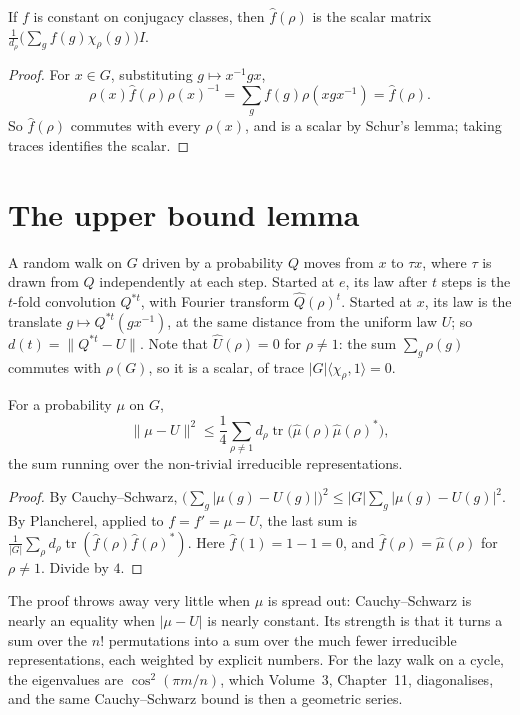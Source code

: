 \begin{proposition}\label{prop:classfourier}
If $f$ is constant on conjugacy classes, then $\hat f(\rho)$ is the scalar matrix $\frac1{d_\rho}\bigl(\sum_gf(g)\chi_\rho(g)\bigr)I$.
\end{proposition}

\begin{proof}
For $x\in G$, substituting $g\mapsto x^{-1}gx$,
\[
\rho(x)\hat f(\rho)\rho(x)^{-1}=\sum_gf(g)\rho(xgx^{-1})=\hat f(\rho).
\] So $\hat f(\rho)$ commutes with every $\rho(x)$, and is a scalar by Schur's lemma; taking traces identifies the scalar.
\end{proof}

\section{The upper bound lemma}

A random walk on $G$ driven by a probability $Q$ moves from $x$ to $\tau x$, where $\tau$ is drawn from $Q$ independently at each step. Started at $e$, its law after $t$ steps is the $t$-fold convolution $Q^{*t}$, with Fourier transform $\hat Q(\rho)^t$. Started at $x$, its law is the
translate $g\mapsto Q^{*t}(gx^{-1})$, at the same distance from the uniform law $U$; so $d(t)=\|Q^{*t}-U\|$. Note that $\hat U(\rho)=0$ for $\rho\ne1$: the sum $\sum_g\rho(g)$ commutes with $\rho(G)$, so it is a scalar, of trace $|G|\langle\chi_\rho,1\rangle=0$.

\begin{lemma}\label{lem:upperbound}
For a probability $\mu$ on $G$,
\[
\|\mu-U\|^2\le\frac14\sum_{\rho\ne1}d_\rho\operatorname{tr}\bigl(\hat\mu(\rho)\hat\mu(\rho)^*\bigr),
\]
the sum running over the non-trivial irreducible representations.
\end{lemma}

\begin{proof}
By Cauchy--Schwarz, $\bigl(\sum_g|\mu(g)-U(g)|\bigr)^2\le|G|\sum_g|\mu(g)-U(g)|^2$. By Plancherel, applied to $f=f'=\mu-U$, the last sum is $\frac1{|G|}\sum_\rho d_\rho\operatorname{tr}(\hat f(\rho)\hat f(\rho)^*)$. Here $\hat f(1)=1-1=0$, and $\hat f(\rho)=\hat\mu(\rho)$ for $\rho\ne1$.
Divide by $4$.
\end{proof}

The proof throws away very little when $\mu$ is spread out: Cauchy--Schwarz is nearly an equality when $|\mu-U|$ is nearly constant. Its strength is that it turns a sum over the $n!$ permutations into a sum over the much fewer irreducible representations, each weighted by
explicit numbers. For the lazy walk on a cycle, the eigenvalues are $\cos^2(\pi m/n)$, which Volume~3, Chapter~11, diagonalises, and the same Cauchy--Schwarz bound is then a geometric series.

